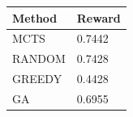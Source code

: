 \begin{tabular}{ll}
\hline
Method & Reward \\
\hline
  MCTS & 0.7442 \\
  RANDOM & 0.7428 \\
  GREEDY & 0.4428 \\
  GA & 0.6955 \\
\hline
\end{tabular}
